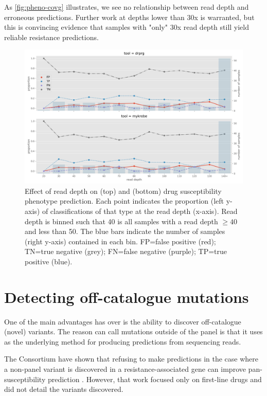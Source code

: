 As \autoref{fig:pheno-covg} illustrates, we see no relationship between \ont{} read depth and erroneous predictions. Further work at depths lower than 30x is warranted, but this is convincing evidence that samples with "only" 30x \ont{} read depth still yield reliable resistance predictions. 

\begin{figure}
\begin{center}
\includegraphics[width=0.90\columnwidth]{Chapter3/Figs/phenotype_coverage.png}
\caption{{Effect of \ont{} read depth on \drprg{} (top) and \mykrobe{} (bottom) drug susceptibility phenotype prediction. Each point indicates the proportion (left y-axis) of classifications of that type at the read depth (x-axis). Read depth is binned such that 40 is all samples with a read depth $\ge40$ and less than 50. The blue bars indicate the number of samples (right y-axis) contained in each bin. FP=false positive (red); TN=true negative (grey); FN=false negative (purple); TP=true positive (blue).
{\label{fig:pheno-covg}}
}}
\end{center}
\end{figure}
\section{Detecting off-catalogue mutations}
\label{sec:drprg-discover}

One of the main advantages \drprg{} has over \mykrobe{} is the ability to discover off-catalogue (novel) variants. The reason \drprg{} can call mutations outside of the panel is that it uses \pandora{} as the underlying method for producing predictions from sequencing reads.

The \cryptic{} Consortium have shown that refusing to make predictions in the case where a non-panel variant is discovered in a resistance-associated gene can improve pan-susceptibility prediction \cite{cryptic2018}. However, that work focused only on first-line drugs and did not detail the variants discovered. 

